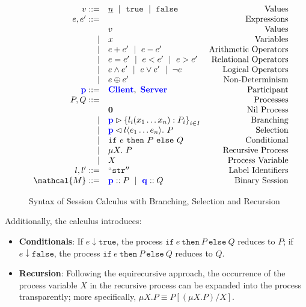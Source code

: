 \begin{figure}[!hb]
\doublespacing
\[
\begin{array}{rlr}

v ::= & \underline{n}~\mid~\texttt{true}~\mid~\texttt{false} & \text{Values} \\
e, e' ::= & & \text{Expressions} \\
	 & v & \text{Values} \\
\mid	 & x & \text{Variables} \\
\mid & e + e'~\mid~e - e' & \text{Arithmetic Operators} \\
\mid & e = e'~\mid~e < e' ~\mid~e > e' & \text{Relational Operators} \\
\mid & e \wedge e'~\mid~e \vee e' ~\mid~\neg e & \text{Logical Operators} \\
\mid & e \oplus e' & \text{Non-Determinism} \\

\parti{p} ::= & \parti{Client},~\parti{Server}& \text{Participant} \\

P,Q ::= & & \text{Processes} \\
     & \mathbf{0} & \text{Nil Process} \\
\mid & \bra{\parti{p}}{l_i(x_1 \dots x_n):P_i}_{i\in I} & \text{Branching} \\
\mid & \sel{\parti{p}}{l}{e_1 \dots e_n}.~P & \text{Selection} \\
\mid & \texttt{if}~e~\texttt{then}~P~\texttt{else}~Q & \text{Conditional} \\
\mid & \mu X.~P & \text{Recursive Process} \\
\mid & X & \text{Process Variable} \\

l, l' ::= & {\tt{``str''}} & \text{Label Identifiers} \\

\mathcal{M} ::= & \parti{p} :: P~\mid~\parti{q} :: Q & \text{Binary Session} \\
\end{array}
\]

\singlespacing
\caption{Syntax of Session Calculus with Branching, Selection and Recursion}
\label{fig:sync}
\end{figure}


Additionally, the calculus introduces:

\begin{itemize}
\item \textbf{Conditionals}: If $e \downarrow \texttt{true}$, the process $\texttt{if}~e~\texttt{then}~P~\texttt{else}~Q$ reduces to $P$; if $e \downarrow \texttt{false}$, the process $\texttt{if}~e~\texttt{then}~P~\texttt{else}~Q$ reduces to $Q$.
\item \textbf{Recursion}: Following the equirecursive approach, the occurrence of the process variable $X$ in the recursive process can be expanded into the process transparently; more specifically, $\mu X. P \equiv P[(\mu X. P)/X]$.
\end{itemize}


